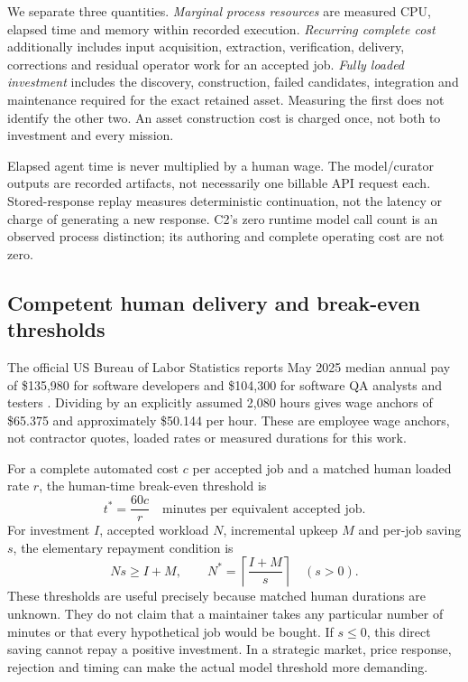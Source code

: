 \documentclass[11pt,a4paper]{article}
\begin{document}
We separate three quantities. \emph{Marginal process resources} are measured CPU, elapsed time and memory within recorded execution. \emph{Recurring complete cost} additionally includes input acquisition, extraction, verification, delivery, corrections and residual operator work for an accepted job. \emph{Fully loaded investment} includes the discovery, construction, failed candidates, integration and maintenance required for the exact retained asset. Measuring the first does not identify the other two. An asset construction cost is charged once, not both to investment and every mission.

Elapsed agent time is never multiplied by a human wage. The model/curator outputs are recorded artifacts, not necessarily one billable API request each. Stored-response replay measures deterministic continuation, not the latency or charge of generating a new response. C2's zero runtime model call count is an observed process distinction; its authoring and complete operating cost are not zero.

\subsection{Competent human delivery and break-even thresholds}
The official US Bureau of Labor Statistics reports May 2025 median annual pay of \$135,980 for software developers and \$104,300 for software QA analysts and testers \cite{bls}. Dividing by an explicitly assumed 2,080 hours gives wage anchors of \$65.375 and approximately \$50.144 per hour. These are employee wage anchors, not contractor quotes, loaded rates or measured durations for this work.

For a complete automated cost $c$ per accepted job and a matched human loaded rate $r$, the human-time break-even threshold is
\[
 t^* = \frac{60c}{r}\quad\text{minutes per equivalent accepted job}.
\]
For investment $I$, accepted workload $N$, incremental upkeep $M$ and per-job saving $s$, the elementary repayment condition is
\[
 Ns \ge I+M,\qquad N^* = \left\lceil\frac{I+M}{s}\right\rceil\quad(s>0).
\]
These thresholds are useful precisely because matched human durations are unknown. They do not claim that a maintainer takes any particular number of minutes or that every hypothetical job would be bought. If $s\le0$, this direct saving cannot repay a positive investment. In a strategic market, price response, rejection and timing can make the actual model threshold more demanding.


\end{document}
